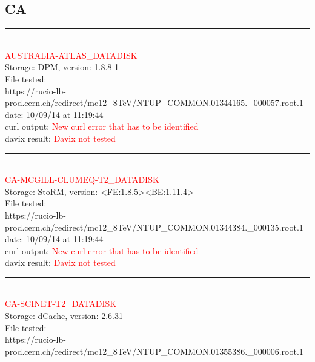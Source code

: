 \subsection{CA}

\rule{\textwidth}{1pt}\\

\textcolor{red}{\normalsize{AUSTRALIA-ATLAS\_DATADISK}}\\

Storage: DPM, version: 1.8.8-1\\

File tested:\\
\footnotesize{https://rucio-lb-prod.cern.ch/redirect/mc12\_8TeV/NTUP\_COMMON.01344165.\_000057.root.1}\\

date: 10/09/14 at 11:19:44\\

curl output:  \textcolor{red}{New curl error that has to be identified}\\

davix result:  \textcolor{red}{Davix not tested}\\

\rule{\textwidth}{1pt}\\

\textcolor{red}{\normalsize{CA-MCGILL-CLUMEQ-T2\_DATADISK}}\\

Storage: StoRM, version: <FE:1.8.5><BE:1.11.4>\\

File tested:\\
\footnotesize{https://rucio-lb-prod.cern.ch/redirect/mc12\_8TeV/NTUP\_COMMON.01344384.\_000135.root.1}\\

date: 10/09/14 at 11:19:44\\

curl output:  \textcolor{red}{New curl error that has to be identified}\\

davix result:  \textcolor{red}{Davix not tested}\\

\rule{\textwidth}{1pt}\\

\textcolor{red}{\normalsize{CA-SCINET-T2\_DATADISK}}\\

Storage: dCache, version: 2.6.31\\

File tested:\\
\footnotesize{https://rucio-lb-prod.cern.ch/redirect/mc12\_8TeV/NTUP\_COMMON.01355386.\_000006.root.1}\\

